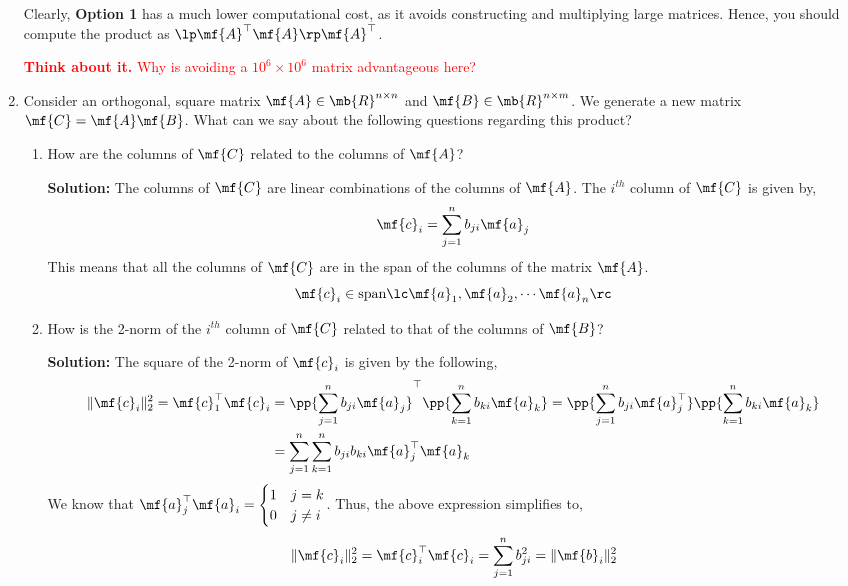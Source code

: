 \begin{enumerate}
\begin{boxedstuff}
        Clearly, \textbf{Option 1} has a much lower computational cost, as it avoids constructing and multiplying large matrices. Hence, you should compute the product as $\lp \mf{A}^\top \mf{A} \rp \mf{A}^\top$.

        \textcolor{red}{\textbf{Think about it.} Why is avoiding a $10^6 \times 10^6$ matrix advantageous here?}
    \end{boxedstuff}
    
    \item Consider an orthogonal, square matrix $\mf{A} \in \mb{R}^{n \times n}$ and $\mf{B} \in \mb{R}^{n \times m}$. We generate a new matrix $\mf{C} = \mf{A}\mf{B}$. What can we say about the following questions regarding this product?
    \begin{enumerate}
        \item How are the columns of $\mf{C}$ related to the columns of $\mf{A}$?
        \begin{boxedstuff}
            \vspace{4mm}
            \textbf{Solution:} The columns of $\mf{C}$ are linear combinations of the columns of $\mf{A}$. The $i^{th}$ column of $\mf{C}$ is given by,
            \[ \mf{c}_i = \sum_{j=1}^n b_{ji} \mf{a}_j \]
            This means that all the columns of $\mf{C}$ are in the span of the columns of the matrix $\mf{A}$.
            \[ \mf{c}_i \in \text{span} \lc \mf{a}_1, \mf{a}_2, \cdots  \mf{a}_n \rc \]
        \end{boxedstuff}
        \item How is the 2-norm of the $i^{th}$ column of $\mf{C}$ related to that of the columns of $\mf{B}$?
        \begin{boxedstuff}
            \vspace{4mm}
            \textbf{Solution:} The square of the 2-norm of $\mf{c}_i$ is given by the following,
            \[ \begin{split}
                \Vert \mf{c}_i \Vert_2^2 = \mf{c}_1^\top\mf{c}_i &= \pp{\sum_{j=1}^n b_{ji} \mf{a}_j}^\top \pp{\sum_{k=1}^n b_{ki} \mf{a}_k} = \pp{\sum_{j=1}^n b_{ji} \mf{a}_j^\top} \pp{\sum_{k=1}^n b_{ki} \mf{a}_k} \\
                &= \sum_{j=1}^n \sum_{k=1}^n b_{ji} b_{ki} \mf{a}_j^\top \mf{a}_k
            \end{split} \]
            We know that $\mf{a}_j^\top \mf{a}_i = \begin{cases} 1 & j = k \\ 0 & j \neq i\end{cases}$. Thus, the above expression simplifies to,
            \[ \Vert \mf{c}_i \Vert_2^2 = \mf{c}_i^\top \mf{c}_i = \sum_{j=1}^n b_{ji}^2 = \Vert \mf{b}_i \Vert_2^2 \]
            

\end{boxedstuff}
\end{enumerate}
\end{enumerate}
